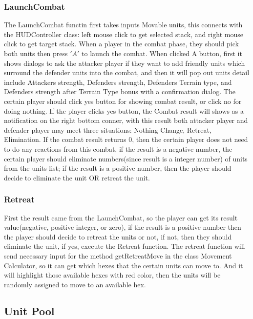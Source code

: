 \documentclass[12pt,a4paper]{article}
\begin{document}
\subsubsection{LaunchCombat}
The LaunchCombat functin first takes inputs Movable units, this connects with the HUDController class: left mouse click to get selected stack, and right mouse click to get target stack. When a player in the combat phase, they should pick both units then press $'A'$ to launch the combat. When clicked A button, first it shows dialogs to ask the attacker player if they want to add friendly units which surround the defender units into the combat, and then it will pop out units detail include Attackers strength, Defenders strength, Defenders Terrain type, and Defenders strength after Terrain Type bonus with a confirmation dialog. The certain player should click yes button for showing combat result, or click no for doing nothing. If the player clicks yes button, the Combat result will shows as a notification on the right bottom conner, with this result both attacker player and defender player may meet three situations: Nothing Change, Retreat, Elimination. If the combat result returns 0, then the certain player does not need to do any reactions from this combat, if the result is a negative number, the certain player should eliminate numbers(since result is a integer number) of units from the units list; if the result is a positive number, then the player should decide to eliminate the unit OR retreat the unit.\\

\subsubsection{Retreat}
First the result came from the LaunchCombat, so the player can get its result value(negative, positive integer, or zero), if the result is a positive number then the player should decide to retreat the units or not, if not, then they should eliminate the unit, if yes, execute the Retreat function. The retreat function will send necessary input for the method getRetreatMove in the class Movement Calculator, so it can get which hexes that the certain units can move to. And it will highlight those available hexes with red color, then the units will be randomly assigned to move to an available hex.

\subsection{Unit Pool}
\end{document}
